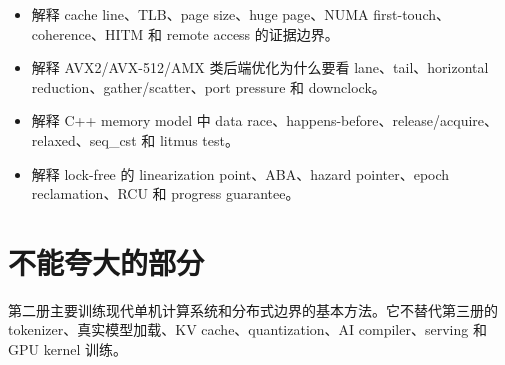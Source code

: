 \begin{itemize}
  \item 解释 cache line、TLB、page size、huge page、NUMA first-touch、coherence、HITM 和 remote access 的证据边界。
  \item 解释 AVX2/AVX-512/AMX 类后端优化为什么要看 lane、tail、horizontal reduction、gather/scatter、port pressure 和 downclock。
  \item 解释 C++ memory model 中 data race、happens-before、release/acquire、relaxed、seq\_cst 和 litmus test。
  \item 解释 lock-free 的 linearization point、ABA、hazard pointer、epoch reclamation、RCU 和 progress guarantee。
\end{itemize}

\section*{不能夸大的部分}

第二册主要训练现代单机计算系统和分布式边界的基本方法。它不替代第三册的 tokenizer、真实模型加载、KV cache、quantization、AI compiler、serving 和 GPU kernel 训练。
